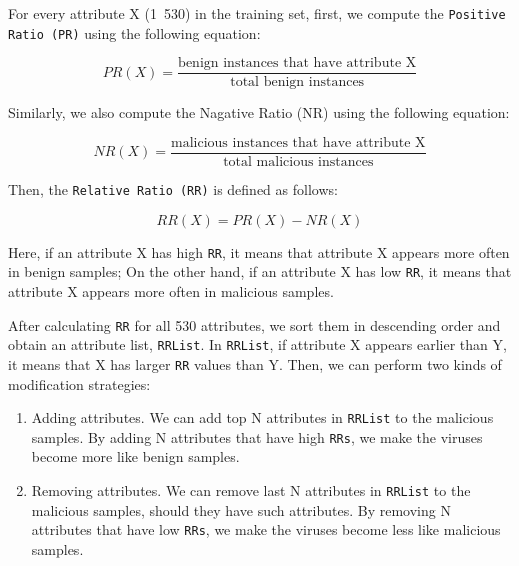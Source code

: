 \documentclass[11pt]{article}
\begin{document}
For every attribute X (1~530) in the training set, first, we compute the \texttt{Positive Ratio (PR)} using the following equation:

\begin{equation}
PR(X) = \frac{\text{benign instances that have attribute X}}{\text{total benign instances}}
\end{equation}

Similarly, we also compute the Nagative Ratio (NR) using the following equation:

\begin{equation}
NR(X) = \frac{\text{malicious instances that have attribute X}}{\text{total malicious instances}}
\end{equation}

Then, the \texttt{Relative Ratio (RR)} is defined as follows:

\begin{equation}
RR(X) = PR(X) - NR(X)
\end{equation}

Here, if an attribute X has high \texttt{RR}, it means that attribute X appears more often in benign samples; On the other hand, if an attribute X has low \texttt{RR}, it means that attribute X appears more often in malicious samples.

After calculating \texttt{RR} for all 530 attributes, we sort them in descending order and obtain an attribute list, \texttt{RRList}. In \texttt{RRList}, if attribute X appears earlier than Y, it means that X has larger \texttt{RR} values than Y. Then, we can perform two kinds of modification strategies:
\begin{enumerate}
\item {Adding attributes.} 
We can add top N attributes in \texttt{RRList} to the malicious samples. By adding N attributes that have high \texttt{RRs}, we make the viruses become more like benign samples.
\item {Removing attributes.}
We can remove last N attributes in \texttt{RRList} to the malicious samples, should they have such attributes. By removing N attributes that have low \texttt{RRs}, we make the viruses become less like malicious samples.
\end{enumerate}

\end{document}
